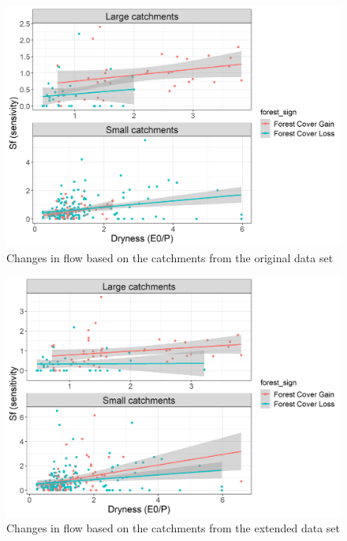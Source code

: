 \documentclass[]{elsarticle} %
\begin{document}
\begin{figure}
\includegraphics[width=0.9\linewidth]{Fig4Zhang} \caption{Changes in flow based on the catchments from the original data set}\label{fig:Fig4Zhang}
\end{figure}

\begin{figure}
\includegraphics[width=0.9\linewidth]{Fig4Zhang_all} \caption{Changes in flow based on the catchments from the extended data set}\label{fig:Fig4Zhangnew}
\end{figure}


\end{document}
